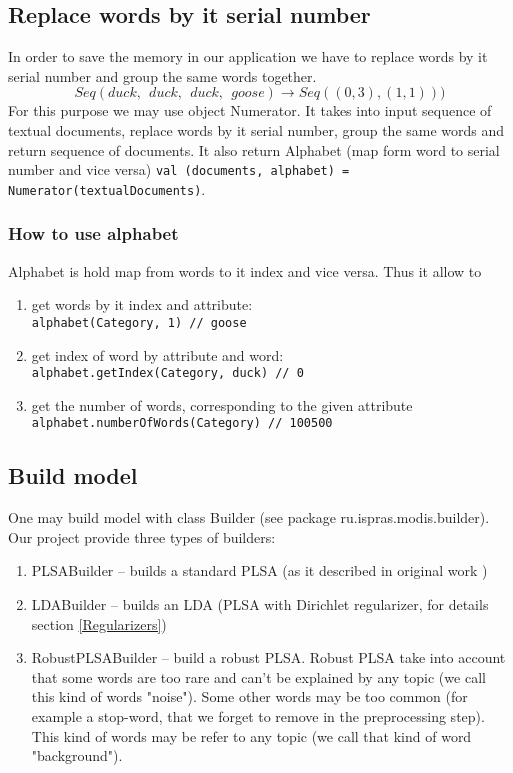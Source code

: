 \subsection{Replace words by it serial number}
    In order to save the memory in our application we have to replace words by it serial number and group the same words together.
    $$ Seq(duck, \ \ duck, \ \ duck, \ \ goose) \to Seq((0, 3), (1, 1))) $$
    For this purpose we may use object Numerator. It takes into input sequence of textual documents, replace words by it serial number,
    group the same words and return sequence of documents. It also return Alphabet (map form word to serial number and vice versa)
    \texttt{val (documents, alphabet) = Numerator(textualDocuments)}.\\ 
    \subsubsection{How to use alphabet}
	Alphabet is hold map from words to it index and vice versa. Thus it allow to
	\begin{enumerate}
	    \item get words by it index and attribute:\\
		\texttt{alphabet(Category, 1) // goose}
	    \item get index of word by attribute and word: \\
		\texttt{alphabet.getIndex(Category, duck) // 0}
	    \item get the number of words, corresponding to the given attribute \\
		\texttt{alphabet.numberOfWords(Category) // 100500}
	\end{enumerate}
	
\subsection{Build model}
    One may build model with class Builder (see package ru.ispras.modis.builder). Our project provide three types of builders:
    \begin{enumerate}
	\item PLSABuilder \--- builds a standard PLSA (as it described in original work \cite{PLSA_original})
	\item LDABuilder  \--- builds an LDA (PLSA with Dirichlet regularizer, for details section \ref{Regularizers})
	\item RobustPLSABuilder \--- build a robust PLSA. Robust PLSA take into account that some words are too rare and can't be explained by any topic 
	    (we call this kind of words "noise"). Some other words may be too common (for example a stop\--word, that we forget to remove in the preprocessing step). This kind of words
	    may be refer to any topic (we call that kind of word "background").  
    \end{enumerate}

